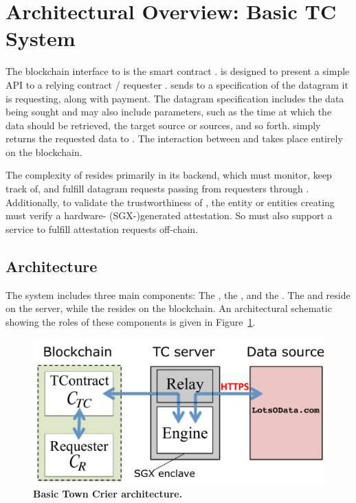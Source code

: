 \section{Architectural Overview: Basic TC System}

The blockchain interface to \tc is the smart contract \tcont. \tcont is designed to present a simple API to a relying contract / requester \reqcont. \reqcont sends to \tcont a specification of the datagram it is requesting, along with payment. The datagram specification includes the data being sought and may also include parameters, such as the time at which the data should be retrieved, the target source or sources, and so forth. \tcont simply returns the requested data to \reqcont. The interaction between \reqcont and \tcont takes place entirely on the blockchain.

The complexity of \tc resides primarily in its backend, which must monitor, keep track of, and fulfill datagram requests passing from requesters through \tcont. Additionally, to validate the trustworthiness of \tc, the entity or entities creating \reqcont must verify a hardware- (SGX-)generated attestation. So \tc must also support a service to fulfill attestation requests off-chain. 

\subsection{Architecture}

The \tcs system includes three main components: The \tcontract, the \encname, and the \medname. The \encname and \medname reside on the \tc server, while the \tcontract resides on the blockchain. An architectural schematic showing the roles of these components is given in Figure~\ref{fig:overview}.

\vspace{-2mm}
\begin{figure}[h!]
\centering
\includegraphics[width=\columnwidth]{figures/OverviewFig}
\caption{{\bf Basic Town Crier architecture.}}
\label{fig:overview}
\end{figure}
\vspace{-2mm}

